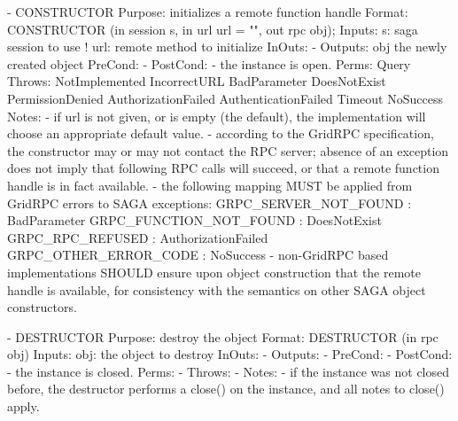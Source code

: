  
 \begin{myspec}
    - CONSTRUCTOR
      Purpose:  initializes a remote function handle
      Format:   CONSTRUCTOR  (in  session   s, 
                              in  url       url = "", 
                              out rpc       obj);
      Inputs:   s:            saga session to use
!               url:          remote method to
                              initialize
      InOuts:   -
      Outputs:  obj           the newly created object
      PreCond:  -
      PostCond: - the instance is open.
      Perms:    Query
      Throws:   NotImplemented
                IncorrectURL
                BadParameter
                DoesNotExist
                PermissionDenied
                AuthorizationFailed
                AuthenticationFailed
                Timeout
                NoSuccess
      Notes:    - if url is not given, or is empty (the 
                  default), the implementation will choose an 
                  appropriate default value.
                - according to the GridRPC specification, the 
                  constructor may or may not contact the RPC
                  server; absence of an exception does not imply
                  that following RPC calls will succeed, or that
                  a remote function handle is in fact available.
                - the following mapping MUST be applied from
                  GridRPC errors to SAGA exceptions:
                  GRPC_SERVER_NOT_FOUND   : BadParameter
                  GRPC_FUNCTION_NOT_FOUND : DoesNotExist
                  GRPC_RPC_REFUSED        : AuthorizationFailed
                  GRPC_OTHER_ERROR_CODE   : NoSuccess
                - non-GridRPC based implementations SHOULD ensure
                  upon object construction that the remote handle
                  is available, for consistency with the
                  semantics on other SAGA object constructors.
 
    - DESTRUCTOR
      Purpose:  destroy the object
      Format:   DESTRUCTOR           (in  rpc  obj)
      Inputs:   obj:                  the object to destroy
      InOuts:   -
      Outputs:  -
      PreCond:  - 
      PostCond: - the instance is closed.
      Perms:    -
      Throws:   - 
      Notes:    - if the instance was not closed before, the 
                  destructor performs a close() on the instance,
                  and all notes to close() apply.
 

\end{myspec}
